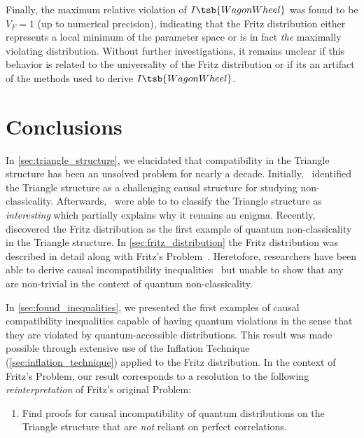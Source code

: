 \documentclass[aps, 10pt, english, twoside, pra, nofootinbib, tightenlines, longbibliography, superscriptaddress]{revtex4-1}
\begin{document}
    Finally, the maximum relative violation of $I\tsb{WagonWheel}$ was found to be $V_F = 1$ (up to numerical precision), indicating that the Fritz distribution either represents a local minimum of the parameter space or is in fact \textit{the} maximally violating distribution. Without further investigations, it remains unclear if this behavior is related to the universality of the Fritz distribution or if its an artifact of the methods used to derive $I\tsb{WagonWheel}$.

    \section{Conclusions}
    \label{sec:conclusions}
    In \cref{sec:triangle_structure}, we elucidated that compatibility in the Triangle structure has been an unsolved problem for nearly a decade. Initially,~\citet{Branciard_2012} identified the Triangle structure as a challenging causal structure for studying non-classicality. Afterwards,~\citet{Henson_2014} were able to to classify the Triangle structure as \textit{interesting} which partially explains why it remains an enigma. Recently,~\citet{Fritz_2012} discovered the Fritz distribution as the first example of quantum non-classicality in the Triangle structure. In \cref{sec:fritz_distribution} the Fritz distribution was described in detail along with Fritz's Problem~\cite[Problem 2.17]{Fritz_2012}. Heretofore, researchers have been able to derive causal incompatibility inequalities~\cite{Inflation,Steudel_2010,Henson_2014} but unable to show that any are non-trivial in the context of quantum non-classicality.

    In \cref{sec:found_inequalities}, we presented the first examples of causal compatibility inequalities capable of having quantum violations in the sense that they are violated by quantum-accessible distributions. This result was made possible through extensive use of the Inflation Technique (\cref{sec:inflation_technique}) applied to the Fritz distribution. In the context of Fritz's Problem, our result corresponds to a resolution to the following \textit{reinterpretation} of Fritz's original Problem:
    \begin{enumerate}[label=\textbf{FP.\Alph*}]
        \setcounter{enumi}{0}
        \item \label{r:1} Find proofs for causal incompatibility of quantum distributions on the Triangle structure that are \textit{not} reliant on perfect correlations.
    \end{enumerate}
\end{document}
